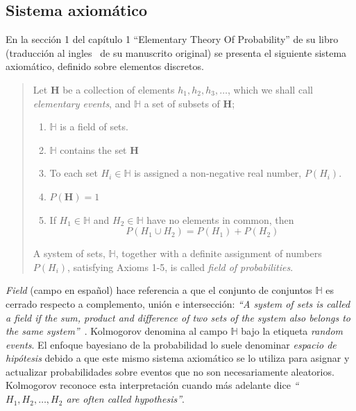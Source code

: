 \documentclass[a4paper,11pt]{book}
\theoremstyle{definition}
\begin{document}
\subsection{Sistema axiom\'atico}

En la secci\'on 1 del cap\'itulo 1 ``Elementary Theory Of Probability'' de su libro (traducci\'on al ingles~\cite{Kolmogorov1950} de su manuscrito original) se presenta el siguiente sistema axiom\'atico, definido sobre elementos discretos.
%
\begin{quotation}
Let $\textbf{H}$ be a collection of elements $h_1, h_2, h_3, \dots$,  which we shall call \emph{elementary events}, and $\mathbb{H}$ a set of subsets of $\textbf{H}$;
\begin{enumerate}\itemsep-0.05cm
  \item $\mathbb{H}$ is a field of sets.
  \item $\mathbb{H}$ contains the set $\textbf{H}$
  \item To each set $H_i \in \mathbb{H}$ is assigned a non-negative real number, $P(H_i)$. \label{item:Kol_3}
  \item $P(\textbf{H}) = 1$ \label{item:Kol_4}
  \item If $H_1 \in \mathbb{H}$ and $H_2 \in \mathbb{H}$ have no elements in common, then
\begin{equation}
  P(H_1 \cup H_2 ) = P(H_1) + P(H_2)
\end{equation} \label{item:Kol_5}
\end{enumerate}
A system of sets, $\mathbb{H}$, together with a definite assignment of numbers $P(H_i)$, satisfying Axioms 1-5, is called \emph{field of probabilities}.
%
%
%
\end{quotation}
%
\emph{Field} (campo en espa\~nol) hace referencia a que el conjunto de conjuntos $\mathbb{H}$ es cerrado respecto a complemento, uni\'on e intersecci\'on: \emph{``A system of sets is called a field if the sum, product and difference of two sets of the system also belongs to the same system''}~\cite{Kolmogorov1950}.
%
Kolmogorov denomina al campo $\mathbb{H}$ bajo la etiqueta \emph{random events}.
%
El enfoque bayesiano de la probabilidad lo suele denominar \emph{espacio de hip\'otesis} debido a que este mismo sistema axiom\'atico se lo utiliza para asignar y actualizar probabilidades sobre eventos que no son necesariamente aleatorios.
%
Kolmogorov reconoce esta interpretaci\'on cuando m\'as adelante dice \emph{``$H_1, H_2, \dots, H_2$ are often called hypothesis''}.
\end{document}
